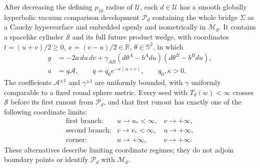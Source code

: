 \begin{proposition}
\label{test:comparison}
After decreasing the defining $p_{10}$ radius of $\mathcal U$, each
$d\in\mathcal U$ has a smooth globally hyperbolic vacuum comparison
development $\mathcal P_d$ containing the whole bridge $\Sigma$ as
a Cauchy hypersurface and embedded openly and isometrically in
$\mathcal M_d$. It contains a spacelike cylinder $\mathcal S$ and
its full future product wedge, with coordinates
$t=(u+v)/2\ge0$, $x=(v-u)/2\in\mathbb R$,
$\theta\in\mathbb S^2$, in which
\begin{equation}\label{test:wedge}
 \begin{split}
 g&=-2a\,du\,dv+
 \gamma_{AB}(d\theta^A-b^Adu)(d\theta^B-b^Bdu),\\
 a&=q\mathcal A,\qquad
 q=q_0e^{-\kappa(u+v)},\qquad q_0,\kappa>0.
 \end{split}
\end{equation}
The coefficients $\mathcal A^{\pm1}$ and $\gamma^{\pm1}$ are
uniformly bounded, with $\gamma$ uniformly comparable to a fixed
round sphere metric. Every seed with $T_d(w)<\infty$ crosses
$\mathcal S$ before its first runout from $\mathcal P_d$, and
that first runout has exactly one of the following coordinate limits:
\begin{equation}\label{test:runout}
 \begin{array}{lll}
 \text{first branch:}&u\to u_*<\infty,&v\to+\infty,\\
 \text{second branch:}&v\to v_*<\infty,&u\to+\infty,\\
 \text{corner:}&u\to+\infty,&v\to+\infty.
 \end{array}
\end{equation}
These alternatives describe limiting coordinate regimes; they do not
adjoin boundary points or identify $\mathcal P_d$ with
$\mathcal M_d$.
\end{proposition}

